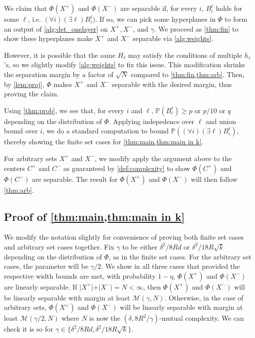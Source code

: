 \documentclass[aoap]{imsart}
\numberwithin{equation}{section}
\theoremstyle{definition}
\theoremstyle{remark}
\numberwithin{equation}{section}
\newcommand{\0}{\mathbf{0}}
\newcommand{\1}{\mathbf{1}}
\renewcommand{\P}{\mathbb{P}}
\numberwithin{equation}{section}
\begin{document}
We claim that $\Phi(X^+)$ and $\Phi(X^-)$ are separable if, for every $i$, $B_i^\ell$ holds for some $\ell$, i.e. $(\forall i)(\exists \ell)B_{i}^{\ell})$. If so, we can pick some hyperplanes in $\Phi$ to form an output of \cref{alg:det_onelayer} on $X^+, X^-$, and $\gamma$. We proceed as \cref{thm:fin} to show these hyperplanes make $X^+$ and $X^-$ separable via \cref{alg:weights}.

However, it is possible that the same $H_\ell$ may satisfy the conditions of multiple $h_i$'s, so we slightly modify \cref{alg:weights} to fix this issue. This modification shrinks the separation margin by a factor of $\sqrt{N}$ compared to \cref{thm:fin,thm:arb}. Then, by \cref{lem:proj}, $\Phi$ makes $X^+$ and $X^-$ separable with the desired margin, thus proving the claim. 

Using \cref{thm:prob}, we see that, for every $i$ and $\ell$, $\P (B_{i}^{\ell})\geq p$ or $p/10$ or $q$ depending on the distribution of $\Phi$. Applying indepedence over $\ell$ and union bound over $i$, we do a standard computation to bound $\P((\forall i)(\exists \ell)B_{i}^{\ell})$, thereby showing the finite set cases for \cref{thm:main,thm:main in k}.

For arbitrary sets $X^+$ and $X^-$, we modify apply the argument above to the centers $C^{+}$ and $C^{-}$ as guaranteed by \cref{def:complexity} to show $\Phi(C^{+})$ and $\Phi(C^{-})$ are separable. The result for $\Phi(X^{+})$ and $\Phi(X^{-})$ will then follow \cref{thm:arb}.
\subsection{Proof of \cref{thm:main,thm:main in k}}\label{sec:1.3}
We modify the notation slightly for convenience of proving both finite set cases and arbitrary set cases together. Fix $\gamma$ to be either $\delta^2/8Rd$ or $\delta^2/18R\sqrt{k}$ depending on the distribution of $\Phi$, as in the finite set cases. For the arbitrary set cases, the parameter will be $\gamma/2$. We show in all three cases that provided the respective width bounds are met, with probability $1-\eta$, $\Phi(X^+)$ and $\Phi(X^-)$ are linearly separable. If $\vert X^+\vert +\vert X^-\vert = N <\infty$, then $\Phi(X^+)$ and $\Phi(X^-)$ will be linearly separable with margin at least $\mathcal{M}(\gamma, N)$. Otherwise, in the case of arbitrary sets, $\Phi(X^+)$ and $\Phi(X^-)$ will be linearly separable with margin at least $\mathcal{M}(\gamma/2, N)$ where $N$ is now the $(\delta, 8R^2/\gamma)$-mutual complexity. We can check it is so for $\gamma\in\lbrace \delta^2/8Rd, \delta^2/18R\sqrt{k}\rbrace$.
\end{document}
